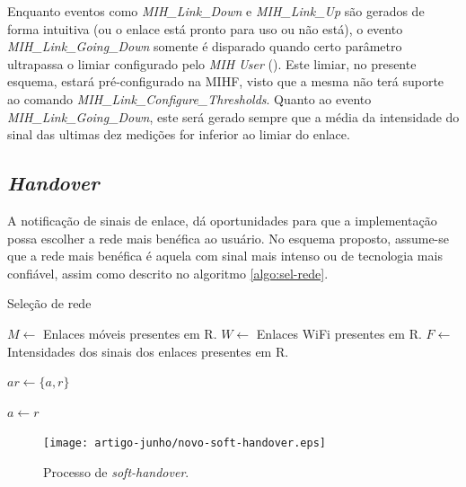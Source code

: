 \documentclass[12pt]{article}
\begin{document}
Enquanto eventos como \textit{MIH\_Link\_Down} e \textit{MIH\_Link\_Up} são 
gerados de forma intuitiva (ou o enlace está pronto para uso ou não está), o 
evento \textit{MIH\_Link\_Going\_Down} somente é disparado quando certo 
parâmetro ultrapassa o limiar configurado pelo \textit{MIH User} 
(\cite{ieee:2008:80221}). Este limiar, no presente esquema, estará 
pré-configurado na MIHF, visto que a mesma não terá suporte ao comando 
\textit{MIH\_Link\_Configure\_Thresholds}. Quanto ao evento 
\textit{MIH\_Link\_Going\_Down}, este será gerado sempre que a média da 
intensidade do sinal das ultimas dez medições for inferior ao limiar do 
enlace.


\subsection{\textit{Handover}} %

A notificação de sinais de enlace, dá oportunidades para que a implementação 
possa escolher a rede mais benéfica ao usuário. No esquema proposto, assume-se 
que a rede mais benéfica é aquela com sinal mais intenso ou de tecnologia mais 
confiável, assim como descrito no algoritmo \ref{algo:sel-rede}.

\begin{algorithm}
	\caption{Seleção de rede\label{algo:sel-rede}}
	\begin{algorithmic}[1]
			\State $M \gets$ Enlaces móveis presentes em R.
			\State $W \gets$ Enlaces WiFi presentes em R.
			\State $F \gets$ Intensidades dos sinais dos enlaces presentes em R.


				\State $ar \gets \{a, r\}$


					\State $a \gets r$
					
				\EndIf

			\EndFor

			\State {}

		\EndFunction
	\end{algorithmic}
\end{algorithm}

\begin{figure}[ht]
	\centering
	\texttt{[image: artigo-junho/novo-soft-handover.eps]}
	\caption{Processo de \textit{soft-handover}.}
	\label{fig:soft-handover}
\end{figure}
\end{document}
